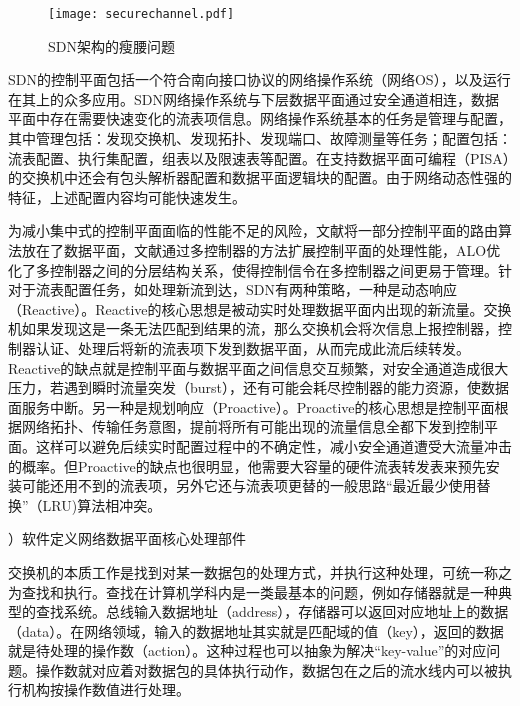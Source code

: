 \begin{figure}[!ht]
	\centering 
	\vspace{-1.5mm}
	\texttt{[image: securechannel.pdf]}
	\caption{SDN架构的瘦腰问题} \label{fig:securechannel}
\end{figure}

SDN的控制平面包括一个符合南向接口协议的网络操作系统（网络OS），以及运行在其上的众多应用。SDN网络操作系统与下层数据平面通过安全通道相连，数据平面中存在需要快速变化的流表项信息。网络操作系统基本的任务是管理与配置，其中管理包括：发现交换机、发现拓扑、发现端口、故障测量等任务；配置包括：流表配置、执行集配置，组表以及限速表等配置。在支持数据平面可编程（PISA）的交换机中还会有包头解析器配置和数据平面逻辑块的配置。由于网络动态性强的特征，上述配置内容均可能快速发生。

为减小集中式的控制平面面临的性能不足的风险，文献\cite{curtis2011devoflow,openflowhibd,yu2010scalable}将一部分控制平面的路由算法放在了数据平面，文献\cite{yazici2014controlling,openflow12}通过多控制器的方法扩展控制平面的处理性能，ALO\cite{alo2012}优化了多控制器之间的分层结构关系，使得控制信令在多控制器之间更易于管理。针对于流表配置任务，如处理新流到达，SDN有两种策略，一种是动态响应（Reactive）。Reactive的核心思想是被动实时处理数据平面内出现的新流量。交换机如果发现这是一条无法匹配到结果的流，那么交换机会将次信息上报控制器，控制器认证、处理后将新的流表项下发到数据平面，从而完成此流后续转发。Reactive的缺点就是控制平面与数据平面之间信息交互频繁，对安全通道造成很大压力，若遇到瞬时流量突发（burst），还有可能会耗尽控制器的能力资源，使数据面服务中断。另一种是规划响应（Proactive）。Proactive的核心思想是控制平面根据网络拓扑、传输任务意图，提前将所有可能出现的流量信息全都下发到控制平面。这样可以避免后续实时配置过程中的不确定性，减小安全通道遭受大流量冲击的概率。但Proactive的缺点也很明显，他需要大容量的硬件流表转发表来预先安装可能还用不到的流表项，另外它还与流表项更替的一般思路“最近最少使用替换”（LRU)算法相冲突。









{）软件定义网络数据平面核心处理部件}


交换机的本质工作是找到对某一数据包的处理方式，并执行这种处理，可统一称之为查找和执行。查找在计算机学科内是一类最基本的问题，例如存储器就是一种典型的查找系统。总线输入数据地址（address），存储器可以返回对应地址上的数据（data）。在网络领域，输入的数据地址其实就是匹配域的值（key），返回的数据就是待处理的操作数（action）。这种过程也可以抽象为解决“key-value”的对应问题。操作数就对应着对数据包的具体执行动作，数据包在之后的流水线内可以被执行机构按操作数值进行处理。

